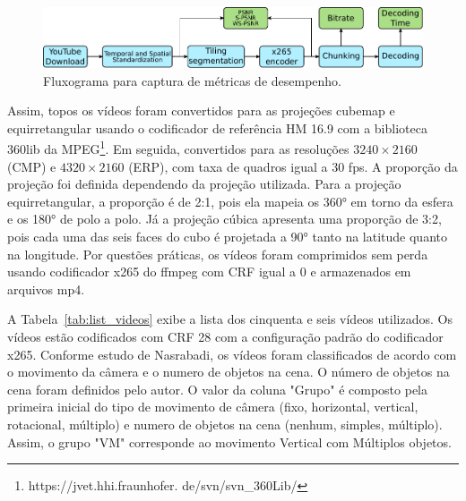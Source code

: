 \begin{figure}[h]
        \centering
        \includegraphics[width=0.7\linewidth]{fig/Fluxograma1.pdf}
        \caption{Fluxograma para captura de métricas de desempenho.}
        \label{fig:fluxograma1}
\end{figure}

Assim, topos os vídeos foram convertidos para as projeções cubemap e equirretangular usando o codificador de referência HM 16.9 com a biblioteca 360lib da MPEG\footnote{https://jvet.hhi.fraunhofer. de/svn/svn\_360Lib/}. Em seguida, convertidos para as resoluções $3240\times2160$ (CMP) e $4320\times2160$ (ERP), com taxa de quadros igual a 30 fps. A proporção da projeção foi definida dependendo da projeção utilizada. Para a projeção equirretangular, a proporção é de 2:1, pois ela mapeia os 360° em torno da esfera e os 180° de polo a polo. Já a projeção cúbica apresenta uma proporção de 3:2, pois cada uma das seis faces do cubo é projetada a 90° tanto na latitude quanto na longitude. Por questões práticas, os vídeos foram comprimidos sem perda usando codificador x265 do ffmpeg com CRF igual a 0 e armazenados em arquivos mp4.

A Tabela~\ref{tab:list_videos} exibe a lista dos cinquenta e seis vídeos utilizados. Os vídeos estão codificados com CRF 28 com a configuração padrão do codificador x265. Conforme estudo de Nasrabadi, os vídeos foram classificados de acordo com o movimento da câmera e o numero de objetos na cena. O número de objetos na cena foram definidos pelo autor. O valor da coluna "Grupo" é composto pela primeira inicial do tipo de movimento de câmera (fixo, horizontal, vertical, rotacional, múltiplo) e numero de objetos na cena (nenhum, simples, múltiplo). Assim, o grupo "VM" corresponde ao movimento Vertical com Múltiplos objetos.

